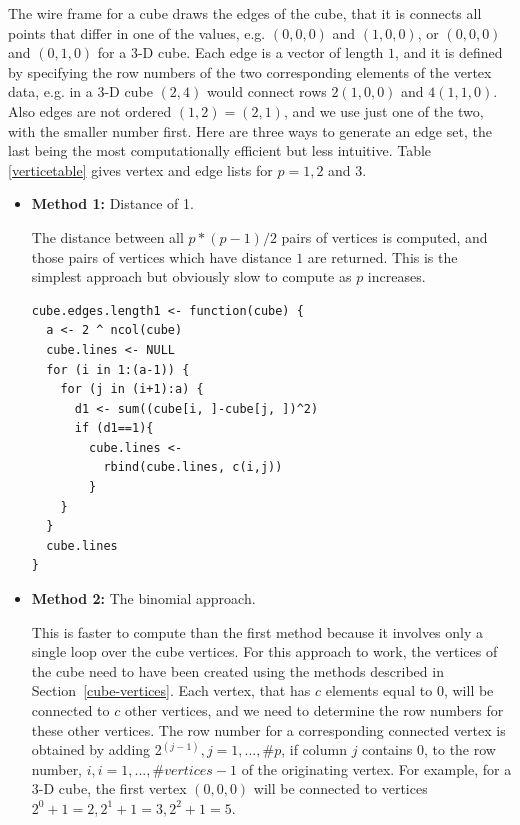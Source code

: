 \documentclass[a4paper]{report}
\begin{document}
\begin{article}
The wire frame for a cube draws the edges of the cube, that it is
connects all points that differ in one of the values, e.g. $(0,0,0)$
and $(1,0,0)$, or $(0,0,0)$ and $(0,1,0)$ for a 3-D cube. Each edge is
a vector of length $1$, and it is defined by specifying the row
numbers of the two corresponding elements of the vertex data, e.g. in
a 3-D cube $(2,4)$ would connect rows $2 (1,0,0)$ and $4
(1,1,0)$. Also edges are not ordered $(1,2)=(2,1)$, and we use just
one of the two, with the smaller number first. Here are three ways to
generate an edge set, the last being the most computationally
efficient but less intuitive. Table \ref{verticetable} gives vertex
and edge lists for $p=1, 2$ and $3$.

\begin{itemize}

  \item {\bf Method 1:} Distance of 1.
  
    The distance between all $p * (p - 1) / 2$ pairs of vertices is
    computed, and those pairs of vertices which have distance $1$ are
    returned. This is the simplest approach but obviously slow to
    compute as $p$ increases.

\begin{verbatim}
cube.edges.length1 <- function(cube) {
  a <- 2 ^ ncol(cube)
  cube.lines <- NULL
  for (i in 1:(a-1)) {
    for (j in (i+1):a) {
      d1 <- sum((cube[i, ]-cube[j, ])^2)
      if (d1==1){
        cube.lines <- 
          rbind(cube.lines, c(i,j))
        }
    }     
  }
  cube.lines
}
\end{verbatim}

  \item {\bf Method 2:} The binomial approach.
  
    This is faster to compute than the first method because it
    involves only a single loop over the cube vertices. For this
    approach to work, the vertices of the cube need to have been
    created using the methods described in
    Section~\ref{cube-vertices}. Each vertex, that has $c$ elements
    equal to 0, will be connected to $c$ other vertices, and we need
    to determine the row numbers for these other vertices. The row
    number for a corresponding connected vertex is obtained by adding
    2$^{(j-1)}, j=1,...,\#p$, if column $j$ contains 0, to the row
    number, $i, i=1,...,\#vertices-1$ of the originating vertex. For
    example, for a 3-D cube, the first vertex $(0,0,0)$ will be
    connected to vertices $2^0+1=2, 2^1+1=3, 2^2+1=5$.


\end{itemize}
\end{article}
\end{document}
